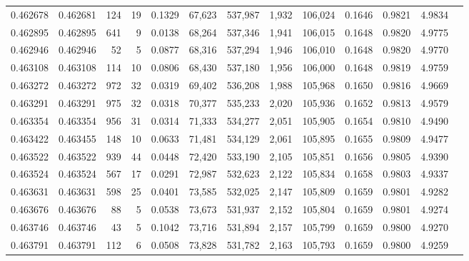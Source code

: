 \begin{tabular}{rrrrrrrrrrrrr}
0.462678 & 0.462681 &   124 &    19 &                                     0.1329 &  67,623 & 537,987 &   1,932 & 106,024 & 0.1646 & 0.9821 & 4.9834 \\
0.462895 & 0.462895 &   641 &     9 &                                     0.0138 &  68,264 & 537,346 &   1,941 & 106,015 & 0.1648 & 0.9820 & 4.9775 \\
0.462946 & 0.462946 &    52 &     5 &                                     0.0877 &  68,316 & 537,294 &   1,946 & 106,010 & 0.1648 & 0.9820 & 4.9770 \\
0.463108 & 0.463108 &   114 &    10 &                                     0.0806 &  68,430 & 537,180 &   1,956 & 106,000 & 0.1648 & 0.9819 & 4.9759 \\
0.463272 & 0.463272 &   972 &    32 &                                     0.0319 &  69,402 & 536,208 &   1,988 & 105,968 & 0.1650 & 0.9816 & 4.9669 \\
0.463291 & 0.463291 &   975 &    32 &                                     0.0318 &  70,377 & 535,233 &   2,020 & 105,936 & 0.1652 & 0.9813 & 4.9579 \\
0.463354 & 0.463354 &   956 &    31 &                                     0.0314 &  71,333 & 534,277 &   2,051 & 105,905 & 0.1654 & 0.9810 & 4.9490 \\
0.463422 & 0.463455 &   148 &    10 &                                     0.0633 &  71,481 & 534,129 &   2,061 & 105,895 & 0.1655 & 0.9809 & 4.9477 \\
0.463522 & 0.463522 &   939 &    44 &                                     0.0448 &  72,420 & 533,190 &   2,105 & 105,851 & 0.1656 & 0.9805 & 4.9390 \\
0.463524 & 0.463524 &   567 &    17 &                                     0.0291 &  72,987 & 532,623 &   2,122 & 105,834 & 0.1658 & 0.9803 & 4.9337 \\
0.463631 & 0.463631 &   598 &    25 &                                     0.0401 &  73,585 & 532,025 &   2,147 & 105,809 & 0.1659 & 0.9801 & 4.9282 \\
0.463676 & 0.463676 &    88 &     5 &                                     0.0538 &  73,673 & 531,937 &   2,152 & 105,804 & 0.1659 & 0.9801 & 4.9274 \\
0.463746 & 0.463746 &    43 &     5 &                                     0.1042 &  73,716 & 531,894 &   2,157 & 105,799 & 0.1659 & 0.9800 & 4.9270 \\
0.463791 & 0.463791 &   112 &     6 &                                     0.0508 &  73,828 & 531,782 &   2,163 & 105,793 & 0.1659 & 0.9800 & 4.9259 \\

\end{tabular}
